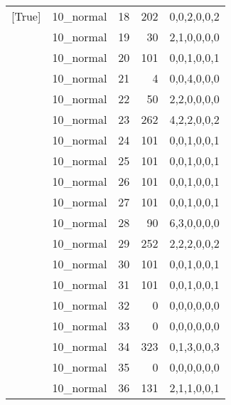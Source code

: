 \begin{tabular}{llrrl}
 [True]          & 10\_normal           &            18 &                   202 & 0,0,2,0,0,2   \\
 [True]          & 10\_normal           &            19 &                    30 & 2,1,0,0,0,0   \\
 [True]          & 10\_normal           &            20 &                   101 & 0,0,1,0,0,1   \\
 [True]          & 10\_normal           &            21 &                     4 & 0,0,4,0,0,0   \\
 [True]          & 10\_normal           &            22 &                    50 & 2,2,0,0,0,0   \\
 [True]          & 10\_normal           &            23 &                   262 & 4,2,2,0,0,2   \\
 [True]          & 10\_normal           &            24 &                   101 & 0,0,1,0,0,1   \\
 [True]          & 10\_normal           &            25 &                   101 & 0,0,1,0,0,1   \\
 [True]          & 10\_normal           &            26 &                   101 & 0,0,1,0,0,1   \\
 [True]          & 10\_normal           &            27 &                   101 & 0,0,1,0,0,1   \\
 [True]          & 10\_normal           &            28 &                    90 & 6,3,0,0,0,0   \\
 [True]          & 10\_normal           &            29 &                   252 & 2,2,2,0,0,2   \\
 [True]          & 10\_normal           &            30 &                   101 & 0,0,1,0,0,1   \\
 [True]          & 10\_normal           &            31 &                   101 & 0,0,1,0,0,1   \\
 [True]          & 10\_normal           &            32 &                     0 & 0,0,0,0,0,0   \\
 [True]          & 10\_normal           &            33 &                     0 & 0,0,0,0,0,0   \\
 [True]          & 10\_normal           &            34 &                   323 & 0,1,3,0,0,3   \\
 [True]          & 10\_normal           &            35 &                     0 & 0,0,0,0,0,0   \\
 [True]          & 10\_normal           &            36 &                   131 & 2,1,1,0,0,1   \\

\end{tabular}
